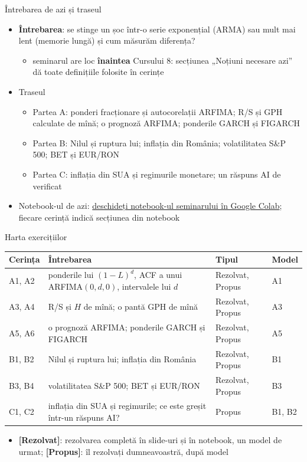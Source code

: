 \begin{frame}{Întrebarea de azi și traseul}
\itemsize{\small}
\begin{itemize}
    \item \textbf{Întrebarea}: se stinge un șoc într-o serie exponențial (ARMA) sau mult mai lent (memorie lungă) și cum măsurăm diferența?
    \begin{itemize}
        \item seminarul are loc \textbf{înaintea} Cursului 8: secțiunea „Noțiuni necesare azi” dă toate definițiile folosite în cerințe
    \end{itemize}
    \item Traseul
    \begin{itemize}
        \item Partea A: ponderi fracționare și autocorelații ARFIMA; R/S și GPH calculate de mînă; o prognoză ARFIMA; ponderile GARCH și FIGARCH
        \item Partea B: Nilul și ruptura lui; inflația din România; volatilitatea S\&P 500; BET și EUR/RON
        \item Partea C: inflația din SUA și regimurile monetare; un răspuns AI de verificat
    \end{itemize}
    \item Notebook-ul de azi: \href{\nb}{deschideți notebook-ul seminarului în Google Colab}; fiecare cerință indică secțiunea din notebook
\end{itemize}
\end{frame}

\begin{frame}{Harta exercițiilor}
\itemsize{\small}
\begin{center}
\footnotesize
\begin{tabular}{>{\raggedright\arraybackslash}p{1.1cm}>{\raggedright\arraybackslash}p{7.5cm}>{\raggedright\arraybackslash}p{1.9cm}>{\raggedright\arraybackslash}p{1.4cm}}
\toprule
\textbf{Cerința} & \textbf{Întrebarea} & \textbf{Tipul} & \textbf{Model} \\
\midrule
A1, A2 & ponderile lui $(1-L)^d$, ACF a unui ARFIMA$(0,d,0)$, intervalele lui $d$ & Rezolvat, Propus & A1 \\
A3, A4 & R/S și $H$ de mînă; o pantă GPH de mînă & Rezolvat, Propus & A3 \\
A5, A6 & o prognoză ARFIMA; ponderile GARCH și FIGARCH & Rezolvat, Propus & A5 \\
B1, B2 & Nilul și ruptura lui; inflația din România & Rezolvat, Propus & B1 \\
B3, B4 & volatilitatea S\&P 500; BET și EUR/RON & Rezolvat, Propus & B3 \\
C1, C2 & inflația din SUA și regimurile; ce este greșit într-un răspuns AI? & Propus & B1, B2 \\
\bottomrule
\end{tabular}
\end{center}
\begin{itemize}
    \item \textbf{[Rezolvat]}: rezolvarea completă în slide-uri și în notebook, un model de urmat; \textbf{[Propus]}: îl rezolvați dumneavoastră, după model
\end{itemize}
\end{frame}

